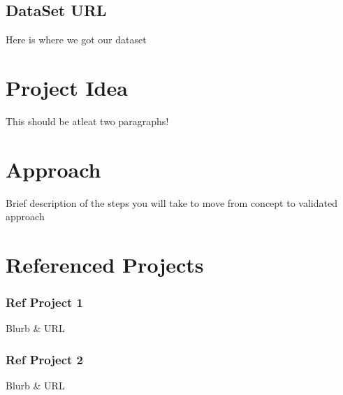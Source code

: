 \documentclass[14pt, letterpaper]{extarticle}
\begin{document}
            \subsection{DataSet URL}
                Here is where we got our dataset

        \section{Project Idea}
        This should be atleat two paragraphs!

        \section{Approach}
        Brief description of the steps you will take to move from concept to validated approach

        \section{Referenced Projects}
            \subsubsection{Ref Project 1}
                Blurb \& URL\\

            \subsubsection{Ref Project 2}
                Blurb \& URL
\end{document}
